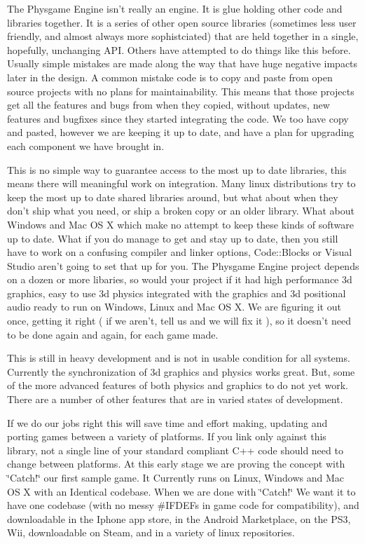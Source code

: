 The Physgame Engine isn't really an engine. It is glue holding other code and libraries together. It is a series of other open source libraries (sometimes less user friendly, and almost always more sophistciated) that are held together in a single, hopefully, unchanging API. Others have attempted to do things like this before. Usually simple mistakes are made along the way that have huge negative impacts later in the design. A common mistake code is to copy and paste from open source projects with no plans for maintainability. This means that those projects get all the features and bugs from when they copied, without updates, new features and bugfixes since they started integrating the code. We too have copy and pasted, however we are keeping it up to date, and have a plan for upgrading each component we have brought in.

This is no simple way to guarantee access to the most up to date libraries, this means there will meaningful work on integration. Many linux distributions try to keep the most up to date shared libraries around, but what about when they don't ship what you need, or ship a broken copy or an older library. What about Windows and Mac OS X which make no attempt to keep these kinds of software up to date. What if you do manage to get and stay up to date, then you still have to work on a confusing compiler and linker options, Code::Blocks or Visual Studio aren't going to set that up for you. The Physgame Engine project depends on a dozen or more libaries, so would your project if it had high performance 3d graphics, easy to use 3d physics integrated with the graphics and 3d positional audio ready to run on Windows, Linux and Mac OS X. We are figuring it out once, getting it right ( if we aren't, tell us and we will fix it ), so it doesn't need to be done again and again, for each game made.

This is still in heavy development and is not in usable condition for all systems. Currently the synchronization of 3d graphics and physics works great. But, some of the more advanced features of both physics and graphics to do not yet work. There are a number of other features that are in varied states of development.

If we do our jobs right this will save time and effort making, updating and porting games between a variety of platforms. If you link only against this library, not a single line of your standard compliant C++ code should need to change between platforms. At this early stage we are proving the concept with \char`\"{}Catch!\char`\"{} our first sample game. It Currently runs on Linux, Windows and Mac OS X with an Identical codebase. When we are done with \char`\"{}Catch!\char`\"{} We want it to have one codebase (with no messy \#IFDEFs in game code for compatibility), and downloadable in the Iphone app store, in the Android Marketplace, on the PS3, Wii, downloadable on Steam, and in a variety of linux repositories.

